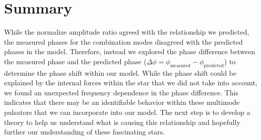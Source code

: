 \chapter{Summary}
	While the normalize amplitude ratio agreed with the relationship we predicted, the measured phases for the combination modes disagreed with the predicted phases in the model. Therefore, instead we explored the phase difference between the measured phase and the predicted phase ($\Delta \phi = \phi_{\text{measured}} - \phi_{\text{predicted}}$) to determine the phase shift within our model. While the phase shift could be explained by the internal forces within the star that we did not take into account, we found an unexpected frequency dependence in the phase difference. This indicates that there may be an identifiable behavior within these multimode pulsators that we can incorporate into our model. The next step is to develop a theory to help us understand what is causing this relationship and hopefully further our understanding of these fascinating stars.

